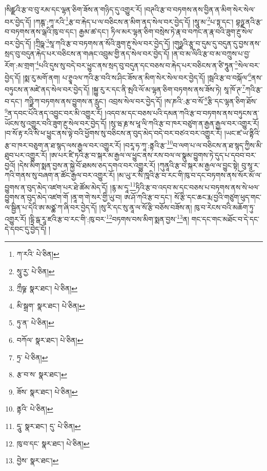 །སིཛྫའི་རྩ་བ་བུ་རམ་དང་ལྷན་ཅིག་ཟོས་ན་གཉིད་དུ་འགྱུར་རོ། །བཊའི་རྩ་བ་བཏགས་ནས་བྱིན་ན་མིག་སེར་སེལ་བར་བྱེད་དོ། །ཀཎྚ་:ཀཱ་རའི་\footnote{ཀ་རའི་  པེ་ཅིན། }རྩ་བ་རྐེད་པ་ལ་བཅིངས་ན་མིག་ནད་སེལ་བར་བྱེད་དོ། །སཱུ་མ་\footnote{སཱུ་རྱ་  པེ་ཅིན། }པ་ཏྟ་དང་། བྷཉྫ་ནའི་རྩ་བ་བཏགས་ནས་ལྒའི་ཁུ་བ་དང་། རྒྱམ་ཚ་དང་། ཏིལ་མར་ལྷན་ཅིག་བསྲེས་ཏེ་རྣ་བ་བཀང་ན་རྣ་བའི་ཟུག་རྔུ་སེལ་བར་བྱེད་དོ། །ཀྲིཥྣ་\footnote{ཀྲྀཥྞ་  སྣར་ཐང་།  པེ་ཅིན། }སཱ་ཀའི་རྩ་བ་བཏགས་ན་སོའི་ཟུག་རྔུ་སེལ་བར་བྱེད་དོ། །གུཉྫའི་རྩཱ་བ་དུམ་དུ་བདུན་དུ་བྱས་ནས་སྲད་བུ་བདུན་རྐེད་པར་བཅིངས་ན་གཞང་འབྲུམ་གྱི་ནད་སེལ་བར་བྱེད་དོ། །ན་བ་མ་ལིའི་རྩ་བ་མ་བཀྲུས་པ་བྱ་རོག་:མ་གྲག་\footnote{མི་སྒྲག་  སྣར་ཐང་།  པེ་ཅིན། }པའི་དུས་སུ་བདེ་བར་ཕྱུང་ནས་སྲད་བུ་བདུན་དང་བཅས་བ་རྐེད་པར་བཅིངས་ན་ཙི་ཏཱུན་\footnote{ཏུ་ན་  པེ་ཅིན། }སེལ་བར་བྱེད་དོ། །སྨ་རུ་མགོ་ནག། པ་ཊྱཱའལ་ཀའི་རྩ་བའི་ས་ཤིང་ཟོས་ན་མིག་སེར་སེལ་བར་བྱེད་དོ། །སྦའི་རྩ་བ་བསྐོལ་\footnote{བཀོལ་  སྣར་ཐང་།  པེ་ཅིན། }ནས་བཏུངས་ན་མཛེ་ནད་སེལ་བར་བྱེད་དོ། །སྐྱུ་རུ་ར་དང་ནི་མྤའི་ལོ་མ་ལྷན་ཅིག་བཏགས་ནས་ཟོས་ཏེ། སཱ་ཁོ་ཊ་\footnote{ཏྲ་  པེ་ཅིན། }ཀའི་རྩ་བ་དང་། ཀཉྫི་ཀ་བཏགས་ནས་བྱུགས་ན་རླུང་། འབྲས་སེལ་བར་བྱེད་དོ། །ས་ཎའི་:རྩ་བ་སོ་\footnote{རྩ་བ་ས་  སྣར་ཐང་། }རྩི་དང་ལྷན་ཅིག་ཐོས་\footnote{ཟོས་  སྣར་ཐང་།  པེ་ཅིན། }ན་དབང་པོའི་ནད་འབྱུང་བར་མི་འགྱུར་རོ། །འདབ་མ་དང་བཅས་པའི་དམན་ཀའི་རྩ་བ་བཏགས་ནས་བཏུངས་ན་ཡོངས་སུ་འགྱུར་བའི་ཟུག་རྔུ་སེལ་བར་བྱེད་དོ། །སུ་ཝ་རྞ་ས་ཕཱ་ལི་ཀའི་རྩ་བ་ཁར་བཙུག་ན་རྒྱན་རྒྱལ་བར་འགྱུར་རོ། །བ་སོ་རྟ་རའི་སི་ཕ་ཕྱུང་ནས་ལྟེ་བའི་ཕྱོགས་སུ་བཅིངས་ན་བུད་མེད་བདེ་བར་བཙའ་བར་འགྱུར་རོ། །ཡང་ཛ་ཡ་ནྟིའི་རྩ་བ་ཁར་བཅུག་ན་ཐ་སྙད་ལས་རྒྱལ་བར་འགྱུར་རོ། །བརཱ་ཧ་ཀཱ་:ནྟའི་རྩ་\footnote{ནྟའི་  པེ་ཅིན། }བ་ལག་པ་ལ་བཅིངས་ན་ཐ་སྙད་ཀྱིས་མི་ཐུབ་པར་འགྱུར་རོ། །ཨ་པར་ཛི་ཏའི་རྩ་བ་སྐར་མ་རྒྱལ་ལ་ཕྱུང་ནས་རས་བལ་ལ་སྣུམ་བྱུགས་ཏེ་དུད་པ་དབབ་བར་བྱའོ། །དེས་མིག་སྨན་བྱས་ན་སྐྱེ་བོ་ཐམས་ཅད་དགའ་བར་འགྱུར་རོ། །ཀུནཱའི་རྩ་བ་སྐར་མ་རྒྱལ་ལ་བྱུང་སྟེ། བུ་སཱ་ར་ཀའི་གནས་སུ་བཞག་ན་ཚོང་རྒྱལ་བར་འགྱུར་རོ། །མ་ཡུ་ར་སི་ཁཱའི་རྩ་བ་རང་གི་ཁུ་བ་དང་བཏགས་ནས་སོར་མོ་ལ་བྱུགས་ན་བུད་མེད་འཛག་པར་ཐེ་ཚོམ་མེད་དོ། །རྙ་མ་དཱ་\footnote{དཱུ་  སྣར་ཐང་། དུ་  པེ་ཅིན། }ཏིའི་རྩ་བ་འདབ་མ་དང་བཅས་པ་བཏགས་ནས་སེ་ཕལ་བྱུགས་ན་བུད་མེད་འཛག་གོ །ནཱ་ག་གེ་སར་གྱི་ཡུ་བ། ཨ་ཤོ་ཀའི་རྩ་བ་དང་། སོ་རྩི་དང་ཆང་རྨ་བྱའི་གཙུག་ཕུད་གང་ལ་སྦྱིན་པ་དེའི་ཨ་མཙྪ་ཀ་ཞི་བར་བྱེད་དོ། །སུ་རི་དང་སུ་ནཱ་ལ་སོ་རྩི་བཅོས་བཟོས་ན། ཁུ་བ་རེངས་བའི་མཆོག་ཏུ་འགྱུར་རོ། །དྷྲི་དྒ་རཱ་ཛའི་རྩ་བ་རང་གི་:ཁུ་བར་\footnote{ཁུ་བ་དང་  སྣར་ཐང་།  པེ་ཅིན། }བཏགས་བས་མིག་སྨན་བྱས་\footnote{བྱེས་  སྣར་ཐང་། }ན། གང་དང་གང་མཐོང་བ་དེ་དང་དེ་དབང་དུ་བྱེད་དོ། །
